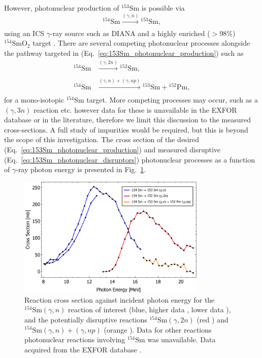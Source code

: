 \documentclass[../main.tex]{subfiles}
\begin{document}
However, photonuclear production of $^{153}\mathrm{Sm}$ \cite{carlos1974giant,filipescu2014photoneutron} is possible via
\begin{equation}
^{154}\mathrm{Sm}\xrightarrow[]{\left(\gamma,n\right)}{}^{153}\mathrm{Sm},
\label{eq:153Sm_photonuclear_production}    
\end{equation}
using an ICS $\gamma$-ray source such as DIANA and a highly enriched ($>$98\%) $^{154}\mathrm{SmO}_{2}$ target \cite{bell1987stable,isoflex2021sm}. There are several competing photonuclear processes alongside the pathway targeted in (Eq.~\ref{eq:153Sm_photonuclear_production}) such as \cite{carlos1974giant}
\begin{align}
^{154}\mathrm{Sm}&\xrightarrow[]{\left(\gamma,2n\right)}{}^{152}\mathrm{Sm},\\
^{154}\mathrm{Sm}&\xrightarrow[]{\left(\gamma,n\right)+\left(\gamma,np\right)}{}^{153}\mathrm{Sm}+{}^{152}\mathrm{Pm},
\label{eq:153Sm_photonuclear_disruptors}    
\end{align}
for a mono-isotopic $^{154}\mathrm{Sm}$ target. More competing processes may occur, such as a $\left(\gamma,3n\right)$ reaction etc. however data for these is unavailable in the EXFOR database \cite{zerkin2018experimental} or in the literature, therefore we limit this discussion to the measured cross-sections. A full study of impurities would be required, but this is beyond the scope of this investigation.   The cross section of the desired (Eq.~\ref{eq:153Sm_photonuclear_production}) and measured disruptive (Eq.~\ref{eq:153Sm_photonuclear_disruptors}) photonuclear processes as a function of $\gamma$-ray photon energy is presented in Fig.~\ref{fig:154Sm_cross_section_photon_energy}.

\begin{figure}[!h]
\centering
\includegraphics[width=0.8\textwidth]{Figures/DIANA_Inverse_Compton_Source_Design/Sm154Landscape.pdf}
\caption{Reaction cross section against incident photon energy for the $^{154}\mathrm{Sm} \left(\gamma,n\right)$ reaction of interest (blue, higher data \cite{carlos1974giant}, lower data \cite{filipescu2014photoneutron}), and the potentially disruptive reactions $^{154}\mathrm{Sm} \left(\gamma,2n\right)$ (red \cite{carlos1974giant}) and $^{154}\mathrm{Sm} \left(\gamma,n\right) + \left(\gamma,np\right)$ (orange \cite{carlos1974giant}). Data for other reactions photonuclear reactions involving $^{154}\mathrm{Sm}$ was unavailable. Data acquired from the EXFOR database \cite{zerkin2018experimental}. }
\label{fig:154Sm_cross_section_photon_energy}
\end{figure}
\end{document}
